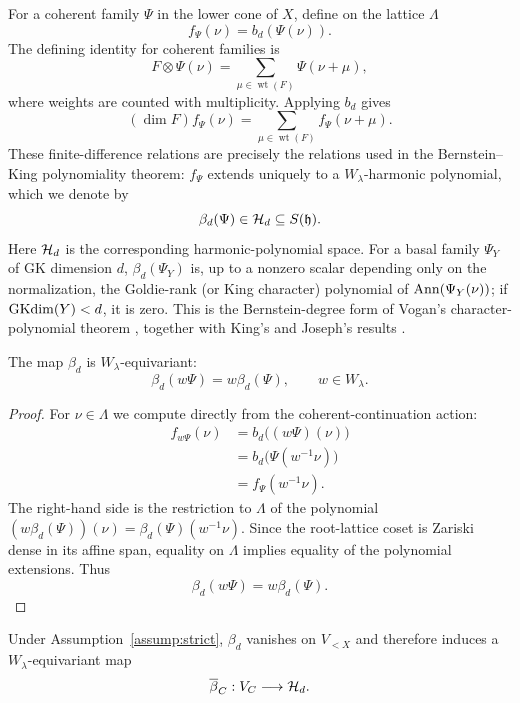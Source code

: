 For a coherent family $\Psi$ in the lower cone of $X$, define on the lattice
$\Lambda$
\[
  f_\Psi(\nu) = b_d(\Psi(\nu)).
\]
The defining identity for coherent families is
\[
  F \otimes \Psi(\nu) = \sum_{\mu \in \operatorname{wt}(F)} \Psi(\nu + \mu),
\]
where weights are counted with multiplicity. Applying $b_d$ gives
\[
  (\dim F) f_\Psi(\nu) = \sum_{\mu \in \operatorname{wt}(F)} f_\Psi(\nu + \mu).
\]
These finite-difference relations are precisely the relations used in the
Bernstein--King polynomiality theorem: $f_\Psi$ extends uniquely to a
$W_\lambda$-harmonic polynomial, which we denote by
\[
  \beta_d(\Psi) \in \mathcal{H}_d \subseteq S(\mathfrak{h}).
\]
Here $\mathcal{H}_d$ is the corresponding harmonic-polynomial space. For a basal
family $\Psi_Y$ of GK dimension $d$, $\beta_d(\Psi_Y)$ is, up to a nonzero
scalar depending only on the normalization, the Goldie-rank (or King
character) polynomial of $\operatorname{Ann}(\Psi_Y(\nu))$; if $\operatorname{GKdim}(Y) < d$, it is zero.
This is the Bernstein-degree form of Vogan's character-polynomial theorem
\cite[Thm.~14.10]{Vogan1982}, together with King's and Joseph's results
\cite{King1981,Joseph1980b}.

\begin{lem}\label{lem:equivariance}
The map $\beta_d$ is $W_\lambda$-equivariant:
\[
  \beta_d(w\Psi) = w\beta_d(\Psi),
  \qquad w \in W_\lambda.
\]
\end{lem}

\begin{proof}
For $\nu \in \Lambda$ we compute directly from the coherent-continuation
action:
\[
\begin{aligned}
  f_{w\Psi}(\nu)
    &= b_d\bigl((w\Psi)(\nu)\bigr) \\
    &= b_d\bigl(\Psi(w^{-1}\nu)\bigr) \\
    &= f_\Psi(w^{-1}\nu).
\end{aligned}
\]
The right-hand side is the restriction to $\Lambda$ of the polynomial
$(w\beta_d(\Psi))(\nu) = \beta_d(\Psi)(w^{-1}\nu)$. Since the root-lattice
coset is Zariski dense in its affine span, equality on $\Lambda$ implies
equality of the polynomial extensions. Thus
\[
  \beta_d(w\Psi) = w\beta_d(\Psi).
\]
\end{proof}

\begin{prop}\label{prop:descent}
Under Assumption~\ref{assump:strict}, $\beta_d$ vanishes on $V_{<X}$ and
therefore induces a $W_\lambda$-equivariant map
\[
  \overline\beta_C : V_C \longrightarrow \mathcal{H}_d.
\]
\end{prop}

